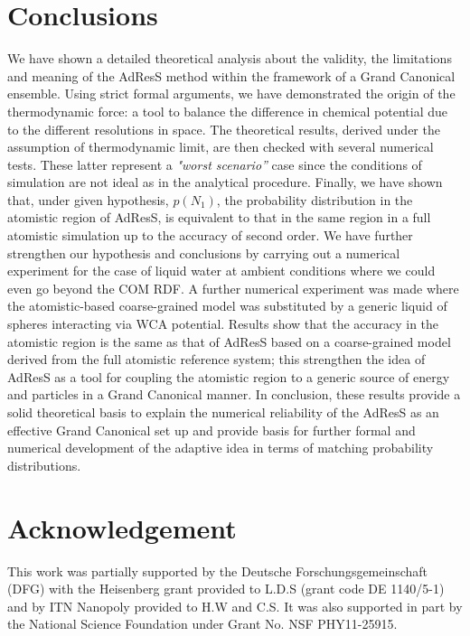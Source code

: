 \documentclass[aps,a4paper,reprint,onecolumn]{revtex4}
\begin{document}
\section{Conclusions}
We have shown a detailed theoretical analysis about the validity, the limitations and meaning of the AdResS method within the framework of a Grand Canonical ensemble.
Using strict formal arguments, we have demonstrated the origin of the thermodynamic force: a tool to balance the difference in chemical potential due to the different resolutions in space.
  The theoretical results, derived under the assumption of thermodynamic limit, are then checked with several numerical tests. These latter represent a {\it "worst scenario''} case since the conditions of simulation are not ideal as in the analytical procedure.
Finally, we have shown that, under given hypothesis, $p(N_{1})$, the probability distribution in the atomistic region of AdResS, is equivalent to that in the same region in a full atomistic simulation up to the accuracy of second order. We have further strengthen our hypothesis and conclusions by carrying out a numerical experiment for the case of liquid water at ambient conditions where we could even go beyond the COM RDF. 
A further numerical experiment was made where the atomistic-based coarse-grained model was substituted by a generic liquid of spheres interacting via WCA potential. Results show that the accuracy in the atomistic region is the same as that of AdResS based on a coarse-grained model derived from the full atomistic reference system; this strengthen the idea of AdResS as a tool for coupling the atomistic region to a generic source of energy and particles in a Grand Canonical manner.
In conclusion, these results provide a solid theoretical basis to explain the numerical reliability of the AdResS as an effective Grand Canonical set up and provide basis for further formal and numerical development of the adaptive idea in terms of matching probability distributions.


\section*{Acknowledgement}
This work was partially supported by the Deutsche Forschungsgemeinschaft (DFG) with the Heisenberg grant provided to L.D.S (grant code DE 1140/5-1) and by ITN Nanopoly provided to H.W and C.S.
It was also supported in part by the National Science Foundation under Grant No. NSF PHY11-25915.
\end{document}
